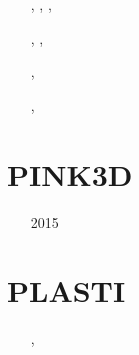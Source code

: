 \begin{small}
\begin{itemize}
                             \textcite{chbl13}
\item[\twothousandfourteen]    \textcite{frba14},  \textcite{gagb14}, 
                               \textcite{bufa14},  \textcite{bufy14b}
\item[\twothousandfifteen]     \textcite{wulc15},  \textcite{gebw15}, \textcite{svlh15}
\item[\twothousandsixteen]     \textcite{marl16},  \textcite{jala16}
\item[\twothousandseventeen]   \textcite{petc17}
\item[\twothousandeighteen]    \textcite{gesr18}
\item[\twothousandnineteen]    \textcite{jala19},  \textcite{chjl19}
\item[\twothousandtwentyone]   \textcite{deol21} 
\item[\twothousandtwentythree] \textcite{gojd23} 
\end{itemize}
\end{small}

\section{PINK3D}

\begin{small}
\begin{itemize}
\item[2015] \textcite{vosc15}
\end{itemize}
\end{small}

\section{PLASTI}

\begin{small}
\begin{itemize}
\item[\twothousandsix]       \textcite{fuwb06}, \textcite{fuwf06}
\item[\twothousandthirteen]  \textcite{cass13}
\item[\twothousandtwenty]    \textcite{femb20}
\item[\twothousandtwentyone] \textcite{femc21}
\end{itemize}
\end{small}

